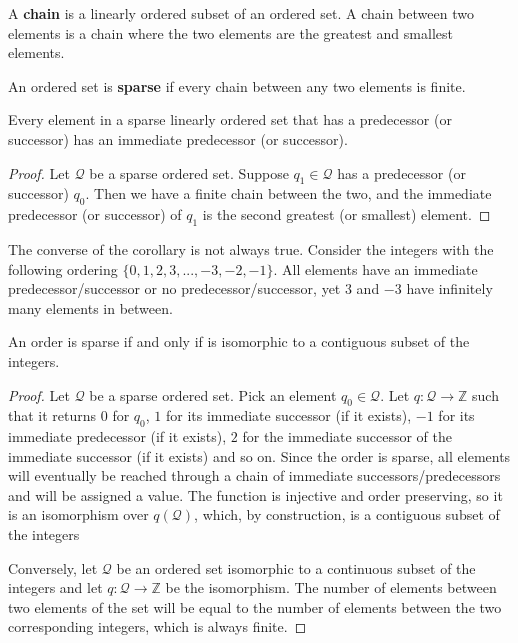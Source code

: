 \documentclass[11pt,letterpaper,fleqn]{memoir} %
\begin{document}
\begin{mathSection}
\begin{defn}
	A \textbf{chain} is a linearly ordered subset of an ordered set. A chain between two elements is a chain where the two elements are the greatest and smallest elements.
\end{defn}
\begin{defn}
	An ordered set is \textbf{sparse} if every chain between any two elements is finite.
\end{defn}
\begin{coro}
	Every element in a sparse linearly ordered set that has a predecessor (or successor) has an immediate predecessor (or successor).
\end{coro}
\begin{proof}
	Let $\mathcal{Q}$ be a sparse ordered set. Suppose $q_1 \in \mathcal{Q}$ has a predecessor (or successor) $q_0$. Then we have a finite chain between the two, and the immediate predecessor (or successor) of $q_1$ is the second greatest (or smallest) element.
\end{proof}

\begin{remark}
	The converse of the corollary is not always true. Consider the integers with the following ordering $\{0, 1, 2, 3, ... , -3, -2, -1\}$. All elements have an immediate predecessor/successor or no predecessor/successor, yet $3$ and $-3$ have infinitely many elements in between.
\end{remark}
\begin{prop}
	An order is sparse if and only if is isomorphic to a contiguous subset of the integers.
\end{prop}
\begin{proof}
	Let $\mathcal{Q}$ be a sparse ordered set. Pick an element $q_0 \in \mathcal{Q}$. Let $q : \mathcal{Q} \to \mathbb{Z}$ such that it returns $0$ for $q_0$, $1$ for its immediate successor (if it exists), $-1$ for its immediate predecessor (if it exists), $2$ for the immediate successor of the immediate successor (if it exists) and so on. Since the order is sparse, all elements will eventually be reached through a chain of immediate successors/predecessors and will be assigned a value. The function is injective and order preserving, so it is an isomorphism over $q(\mathcal{Q})$, which, by construction, is a contiguous subset of the integers
	
	Conversely, let $\mathcal{Q}$ be an ordered set isomorphic to a continuous subset of the integers and let $q : \mathcal{Q} \to \mathbb{Z}$ be the isomorphism. The number of elements between two elements of the set will be equal to the number of elements between the two corresponding integers, which is always finite.
\end{proof}

\end{mathSection}
\end{document}

